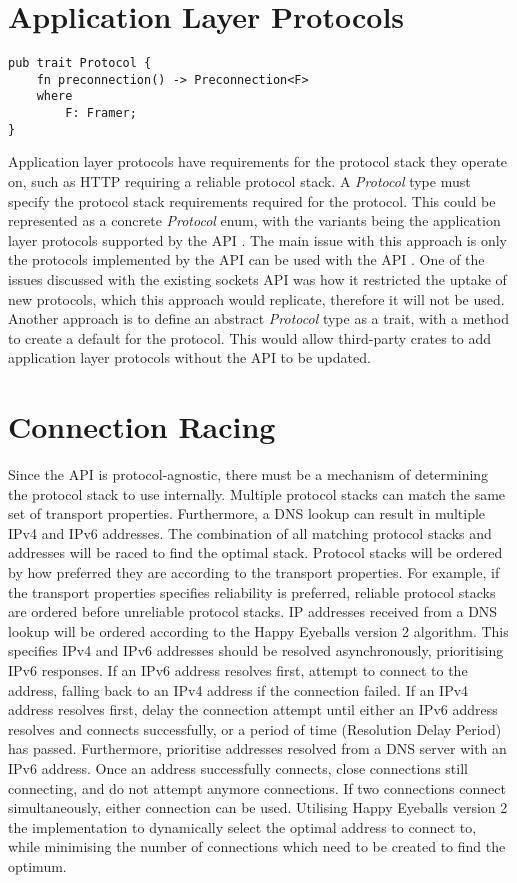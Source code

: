 \section{Application Layer Protocols}\label{sec:application-layer-protocols}
\begin{lstlisting}[float=h, label=lst:protocol, caption={The Protocol trait.}]
pub trait Protocol {
    fn preconnection() -> Preconnection<F>
    where
        F: Framer;
}
\end{lstlisting}

Application layer protocols have requirements for the protocol stack they operate on, such as HTTP requiring a reliable
protocol stack.
A \emph{Protocol} type must specify the protocol stack requirements required for the protocol.
This could be represented as a concrete \emph{Protocol} enum, with the variants being the application layer protocols
supported by the API .
The main issue with this approach is only the protocols implemented by the API can be used with the API .
One of the issues discussed with the existing sockets API was how it restricted the uptake of new protocols, which this
approach would replicate, therefore it will not be used.
Another approach is to define an abstract \emph{Protocol} type as a trait, with a method to create a default
\preconnection{} for the protocol.
This would allow third-party crates to add application layer protocols without the API to be updated.

\section{Connection Racing}\label{sec:connection-racing}
Since the API is protocol-agnostic, there must be a mechanism of determining the protocol stack to use internally.
Multiple protocol stacks can match the same set of transport properties.
Furthermore, a DNS lookup can result in multiple IPv4 and IPv6 addresses.
The combination of all matching protocol stacks and addresses will be raced to find the optimal stack.
Protocol stacks will be ordered by how preferred they are according to the transport properties.
For example, if the transport properties specifies reliability is preferred, reliable protocol stacks are ordered before
unreliable protocol stacks.
IP addresses received from a DNS lookup will be ordered according to the Happy Eyeballs version 2 algorithm.
This specifies IPv4 and IPv6 addresses should be resolved asynchronously, prioritising IPv6 responses.
If an IPv6 address resolves first, attempt to connect to the address, falling back to an IPv4 address if the connection
failed.
If an IPv4 address resolves first, delay the connection attempt until either an IPv6 address resolves and connects
successfully, or a period of time (Resolution Delay Period) has passed.
Furthermore, prioritise addresses resolved from a DNS server with an IPv6 address.
Once an address successfully connects, close connections still connecting, and do not attempt anymore connections.
If two connections connect simultaneously, either connection can be used.
Utilising Happy Eyeballs version 2 the implementation to dynamically select the optimal address to connect to, while
minimising the number of connections which need to be created to find the optimum.

